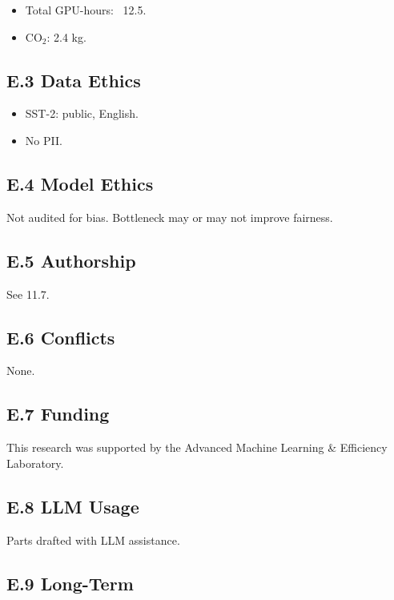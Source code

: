 \begin{itemize}
\item Total GPU-hours: ~12.5.
\item CO$_2$: 2.4 kg.

\end{itemize}
\subsection{E.3 Data Ethics}

\begin{itemize}
\item SST-2: public, English.
\item No PII.

\end{itemize}
\subsection{E.4 Model Ethics}

Not audited for bias. Bottleneck may or may not improve fairness.

\subsection{E.5 Authorship}

See  11.7.

\subsection{E.6 Conflicts}

None.

\subsection{E.7 Funding}

This research was supported by the Advanced Machine Learning \& Efficiency Laboratory.

\subsection{E.8 LLM Usage}

Parts drafted with LLM assistance.

\subsection{E.9 Long-Term}


